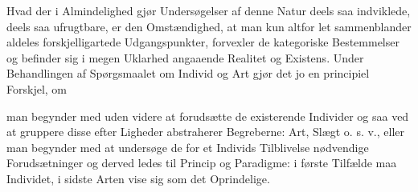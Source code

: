 \documentclass[12pt,a4paper]{book}
\begin{document}
Hvad der i Almindelighed gjør Undersøgelser af denne Natur deels saa
indviklede, deels saa ufrugtbare, er den Omstændighed, at man kun altfor
let sammenblander aldeles forskjelligartede Udgangspunkter, forvexler de
kategoriske Bestemmelser og befinder sig i megen Uklarhed angaaende
Realitet og Existens. Under Behandlingen af Spørgsmaalet om Individ og
Art gjør det jo en principiel Forskjel, om


\setcounter{footnote}{0}
man begynder med uden videre at forudsætte de existerende
Individer og saa ved at gruppere disse efter Ligheder abstraherer
Begreberne: Art, Slægt o. s. v., eller man begynder med at undersøge de
for et Individs Tilblivelse nødvendige Forudsætninger og derved ledes til
Princip og Paradigme: i første Tilfælde maa Individet, i sidste Arten vise
sig som det Oprindelige.
\end{document}
